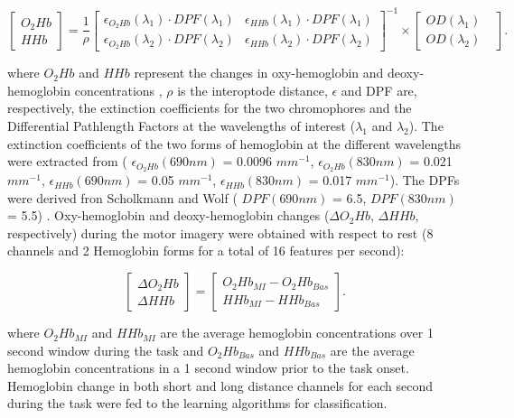 \documentclass[12pt ]{iopart}
\begin{document}
\begin{equation}
\begin{bmatrix}
O_2Hb\\
HHb
\end{bmatrix}
=
\frac{1}{\rho}\begin{bmatrix}
\epsilon_{O_2Hb}(\lambda_1)\cdot DPF(\lambda_1)&\epsilon_{HHb}(\lambda_1)\cdot DPF(\lambda_1)\\
\epsilon_{O_2Hb}(\lambda_2)\cdot DPF(\lambda_2)&\epsilon_{HHb}(\lambda_2)\cdot DPF(\lambda_2)
\end{bmatrix}^{-1}\times
\begin{bmatrix}
OD(\lambda_1)&\\
OD(\lambda_2)
\end{bmatrix}
.
\end{equation}

where $O_{2}Hb$ and $HHb$ represent the changes in oxy-hemoglobin and deoxy-hemoglobin concentrations , $\rho$ is the interoptode distance, $\epsilon$  and DPF are, respectively, the extinction coefficients for the two chromophores and the Differential Pathlength Factors at the wavelengths of interest ($\lambda _{1}$ and $\lambda _{2}$). The extinction coefficients of the two forms of hemoglobin at the different wavelengths  were extracted from \parencite{zijlstra1991absorption} ( $\epsilon_{O_{2}Hb}(690nm)$ = 0.0096 $mm^{-1}$, $\epsilon_{O_{2}Hb}(830nm)$ = 0.021 $mm^{-1}$, $\epsilon_{HHb}(690nm)$ = 0.05 $mm^{-1}$, $\epsilon_{HHb}(830nm)$ = 0.017 $mm^{-1}$).  The DPFs were derived fron Scholkmann and Wolf  ( $DPF(690nm)$ = 6.5, $DPF(830nm)$ = 5.5) \parencite{scholkmann2013general}.
Oxy-hemoglobin and deoxy-hemoglobin changes ($\Delta O_{2}Hb$, $\Delta HHb$, respectively) during the motor imagery were obtained  with respect to rest (8 channels and 2 Hemoglobin forms for a total of 16 features per second):

 \begin{equation}
\begin{bmatrix}
\Delta O_2Hb\\
\Delta HHb
\end{bmatrix}
=
\begin{bmatrix}
O_2Hb_{MI}-O_2Hb_{Bas}\\
HHb_{MI}-HHb_{Bas}
\end{bmatrix}
.
\end{equation}

where $O_{2}Hb_{MI}$ and $HHb_{MI}$ are the average hemoglobin concentrations over 1 second window during the task and $O_{2}Hb_{Bas}$ and $HHb_{Bas}$ are the average hemoglobin concentrations in a 1 second window prior to the task onset.
Hemoglobin change  in both short and long distance channels for each second during the task were fed to the learning algorithms for classification. 
\end{document}

